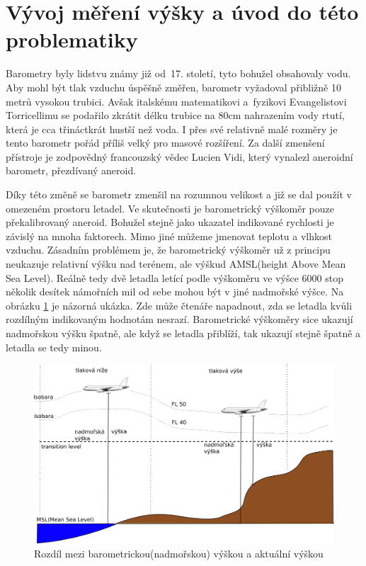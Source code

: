 		
	\section{Vývoj měření výšky a úvod do této problematiky}
	
		Barometry byly lidstvu známy již od~17. století, tyto bohužel obsahovaly vodu. Aby mohl být tlak vzduchu úspěšně změřen, barometr vyžadoval přibližně 10 metrů vysokou trubici. Avšak italskému matematikovi a~fyzikovi Evangelistovi Torricellimu se podařilo zkrátit délku trubice na 80cm nahrazením vody rtutí, která je cca třináctkrát hustší než voda. I přes své relativně malé rozměry je tento barometr pořád příliš velký pro masové rozšíření. Za další zmenšení přístroje je zodpovědný francouzský vědec Lucien Vidi, který vynalezl aneroidní barometr, přezdívaný aneroid\cite{history::aneroid}.\par
		Díky této změně se barometr zmenšil na rozumnou velikost a již se dal použít v omezeném prostoru letadel. Ve skutečnosti je barometrický výškoměr pouze překalibrovaný aneroid. Bohužel stejně jako ukazatel indikované rychlosti je závislý na mnoha faktorech. Mimo jiné můžeme jmenovat teplotu a vlhkost vzduchu. Zásadním problémem je, že barometrický výškoměr už z principu neukazuje relativní výšku nad terénem, ale výškud AMSL(height Above Mean Sea Level). Reálně tedy dvě letadla letící podle výškoměru ve výšce 6000 stop několik desítek námořních mil od sebe mohou být v jiné nadmořské výšce. Na obrázku \ref{historie::vyvojMereniVysky::FL} je názorná ukázka. Zde může čtenáře napadnout, zda se letadla kvůli rozdílným indikovaným hodnotám nesrazí. Barometrické výškoměry sice ukazují nadmořskou výšku špatně, ale když se letadla přiblíží, tak ukazují stejně špatně a letadla se tedy minou.\par
		\begin{figure}[H]
			\begin{center}
				\includegraphics[scale=0.75]{obrazky-figures/flight_level.png}
				\caption{Rozdíl mezi barometrickou(nadmořskou) výškou a aktuální výškou}\label{historie::vyvojMereniVysky::FL}
			\end{center}
		\end{figure}
				
